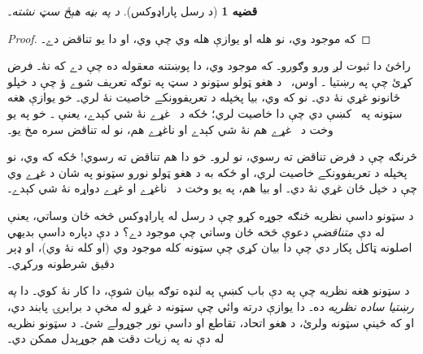 \documentclass[12pt,a4paper]{article}
\newcommand{\Setabs}[2]{\{#1 : #2\}}
\newcommand{\ollabel}[1]{\label{\pspart:\pschapter:\pssection:#1}}
\newenvironment{explain}{}{}
\newenvironment{digress}{\par\medskip}{\par\medskip}
\newenvironment{tagblock}[1]{}{}
\newtheorem{thm}[defn]{قضيه}
\begin{document}
\begin{thm}[د رسل پاراډوکس]\ollabel{thm:russells-paradox}
	د \LR{$R = \Setabs{x}{x \notin x}$} په بڼه هېڅ سټ نشته۔
\end{thm}

\begin{proof}
که \LR{$R = \Setabs{x}{x \notin x}$} موجود وي، نو  هله او يوازې هله وي چې  وي، او دا يو تناقض دے۔
\end{proof}

\begin{tagblock}{novice}
\begin{explain}
راځئ دا ثبوت لږ ورو وګورو۔ که  موجود وي، دا پوښتنه معقوله ده چې  دے که نۀ۔ فرض کړئ چې په رښتيا ۔ اوس، ~د هغو ټولو سټونو د سټ په توګه تعريف شوے ؤ چې د خپلو ځانونو غړي نۀ دي۔ نو که  وي، بيا  پخپله د  تعريفوونکے خاصيت نۀ لري۔ خو يوازې هغه سټونه په~ کښې دي چې دا خاصيت لري؛ ځکه  د~ غړے نۀ شي کېدے، يعنې ۔ خو  په يو وخت د~ غړے هم نۀ شي کېدے او ناغړے هم، نو له تناقض سره مخ يو۔

څرنګه چې د  فرض تناقض ته رسوي، نو  لرو۔ خو دا هم تناقض ته رسوي!{} ځکه که  وي، نو  پخپله د  تعريفوونکے خاصيت لري، او ځکه  به د هغو ټولو نورو سټونو په شان د  غړے وي چې د خپل ځان غړي نۀ دي۔ او بيا هم، په يو وخت د~ ناغړے او غړے دواړه نۀ شي کېدے۔
\end{explain}
\end{tagblock}

\begin{digress}
د سټونو داسې نظريه څنګه جوړه کړو چې د رسل له پاراډوکس څخه ځان وساتي، يعنې له دې \emph{متناقضې} دعوې څخه ځان وساتي چې \LR{$R = \Setabs{x}{x \notin x}$} موجود دے؟ د دې دپاره داسې بديهي اصلونه ټاکل پکار دي چې دا بيان کړي چې سټونه کله موجود وي (او کله نۀ وي)، او ډېر دقيق شرطونه ورکړي۔

د سټونو هغه نظريه چې په دې باب کښې په لنډه توګه بيان شوې، دا کار نۀ کوي۔ دا \emph{په رښتيا ساده نظريه} ده۔ دا يوازې درته وائي چې سټونه د غړو له مخې د برابرۍ پابند دي، او که ځينې سټونه ولرئ، د هغو اتحاد، تقاطع او داسې نور جوړولے شئ۔ د سټونو نظريه له دې نه په زيات دقت هم جوړېدل ممکن دي۔ 
\end{digress}
\end{document}
